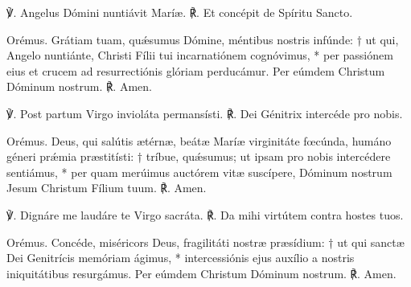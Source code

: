 \label{antiphonaefinales}





℣. Angelus Dómini nuntiávit Maríæ.
℟. Et concépit de Spíritu Sancto.

Orémus.
Grátiam tuam, quǽsumus Dómine, méntibus nostris infúnde: †
ut qui, Angelo nuntiánte, Christi Fílii tui incarnatiónem cognóvimus, *
per passiónem eius et crucem ad resurrectiónis glóriam perducámur.
Per eúmdem Christum Dóminum nostrum. 
℟. Amen.


℣. Post partum Virgo invioláta permansísti.
℟. Dei Génitrix intercéde pro nobis.

Orémus.
Deus, qui salútis ætérnæ, 
beátæ Maríæ virginitáte fœcúnda,
humáno géneri prǽmia præstitísti: †
tríbue, quǽsumus; ut ipsam pro nobis intercédere sentiámus, *
per quam merúimus auctórem vitæ suscípere,
Dóminum nostrum Jesum Christum Fílium tuum.
℟. Amen.



℣. Dignáre me laudáre te Virgo sacráta.
℟. Da mihi virtútem contra hostes tuos.

Orémus.
Concéde, miséricors Deus, fragilitáti nostræ præsídium: †
ut qui sanctæ Dei Genitrícis memóriam ágimus, *
intercessiónis ejus auxílio a nostris iniquitátibus resurgámus.
Per eúmdem Christum Dóminum nostrum.
℟. Amen. 

\vspace{0.5cm}


